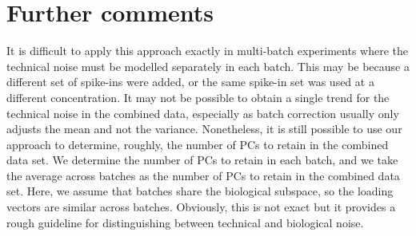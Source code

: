 \documentclass{article}
\begin{document}
\section{Further comments}
It is difficult to apply this approach exactly in multi-batch experiments where the technical noise must be modelled separately in each batch.
This may be because a different set of spike-ins were added, or the same spike-in set was used at a different concentration.
It may not be possible to obtain a single trend for the technical noise in the combined data, especially as batch correction usually only adjusts the mean and not the variance.
Nonetheless, it is still possible to use our approach to determine, roughly, the number of PCs to retain in the combined data set.
We determine the number of PCs to retain in each batch, and we take the average across batches as the number of PCs to retain in the combined data set.
Here, we assume that batches share the biological subspace, so the loading vectors are similar across batches.
Obviously, this is not exact but it provides a rough guideline for distinguishing between technical and biological noise.

%
\end{document}
